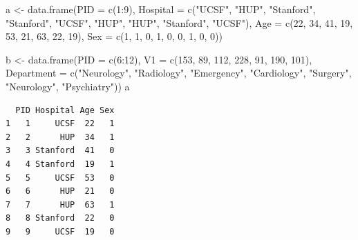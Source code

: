\documentclass[
]{book}
\newenvironment{Shaded}{\begin{snugshade}}{\end{snugshade}}
\newcommand{\AttributeTok}[1]{\textcolor[rgb]{0.77,0.63,0.00}{#1}}
\newcommand{\DecValTok}[1]{\textcolor[rgb]{0.00,0.00,0.81}{#1}}
\newcommand{\FunctionTok}[1]{\textcolor[rgb]{0.00,0.00,0.00}{#1}}
\newcommand{\NormalTok}[1]{#1}
\newcommand{\OtherTok}[1]{\textcolor[rgb]{0.56,0.35,0.01}{#1}}
\newcommand{\SpecialCharTok}[1]{\textcolor[rgb]{0.00,0.00,0.00}{#1}}
\newcommand{\StringTok}[1]{\textcolor[rgb]{0.31,0.60,0.02}{#1}}
\begin{document}
\begin{Shaded}
\begin{Highlighting}[]
\NormalTok{a }\OtherTok{\textless{}{-}} \FunctionTok{data.frame}\NormalTok{(}\AttributeTok{PID =} \FunctionTok{c}\NormalTok{(}\DecValTok{1}\SpecialCharTok{:}\DecValTok{9}\NormalTok{),}
                \AttributeTok{Hospital =} \FunctionTok{c}\NormalTok{(}\StringTok{"UCSF"}\NormalTok{, }\StringTok{"HUP"}\NormalTok{, }\StringTok{"Stanford"}\NormalTok{,}
                             \StringTok{"Stanford"}\NormalTok{, }\StringTok{"UCSF"}\NormalTok{, }\StringTok{"HUP"}\NormalTok{, }
                             \StringTok{"HUP"}\NormalTok{, }\StringTok{"Stanford"}\NormalTok{, }\StringTok{"UCSF"}\NormalTok{),}
                \AttributeTok{Age =} \FunctionTok{c}\NormalTok{(}\DecValTok{22}\NormalTok{, }\DecValTok{34}\NormalTok{, }\DecValTok{41}\NormalTok{, }\DecValTok{19}\NormalTok{, }\DecValTok{53}\NormalTok{, }\DecValTok{21}\NormalTok{, }\DecValTok{63}\NormalTok{, }\DecValTok{22}\NormalTok{, }\DecValTok{19}\NormalTok{),}
                \AttributeTok{Sex =} \FunctionTok{c}\NormalTok{(}\DecValTok{1}\NormalTok{, }\DecValTok{1}\NormalTok{, }\DecValTok{0}\NormalTok{, }\DecValTok{1}\NormalTok{, }\DecValTok{0}\NormalTok{, }\DecValTok{0}\NormalTok{, }\DecValTok{1}\NormalTok{, }\DecValTok{0}\NormalTok{, }\DecValTok{0}\NormalTok{))}

\NormalTok{b  }\OtherTok{\textless{}{-}} \FunctionTok{data.frame}\NormalTok{(}\AttributeTok{PID =} \FunctionTok{c}\NormalTok{(}\DecValTok{6}\SpecialCharTok{:}\DecValTok{12}\NormalTok{),}
                 \AttributeTok{V1 =} \FunctionTok{c}\NormalTok{(}\DecValTok{153}\NormalTok{, }\DecValTok{89}\NormalTok{, }\DecValTok{112}\NormalTok{, }\DecValTok{228}\NormalTok{,  }\DecValTok{91}\NormalTok{, }\DecValTok{190}\NormalTok{, }\DecValTok{101}\NormalTok{),}
                 \AttributeTok{Department =} \FunctionTok{c}\NormalTok{(}\StringTok{"Neurology"}\NormalTok{, }\StringTok{"Radiology"}\NormalTok{,}
                                \StringTok{"Emergency"}\NormalTok{, }\StringTok{"Cardiology"}\NormalTok{,}
                                \StringTok{"Surgery"}\NormalTok{, }\StringTok{"Neurology"}\NormalTok{, }\StringTok{"Psychiatry"}\NormalTok{))}
\NormalTok{a}
\end{Highlighting}
\end{Shaded}

\begin{verbatim}
  PID Hospital Age Sex
1   1     UCSF  22   1
2   2      HUP  34   1
3   3 Stanford  41   0
4   4 Stanford  19   1
5   5     UCSF  53   0
6   6      HUP  21   0
7   7      HUP  63   1
8   8 Stanford  22   0
9   9     UCSF  19   0
\end{verbatim}
\end{document}
